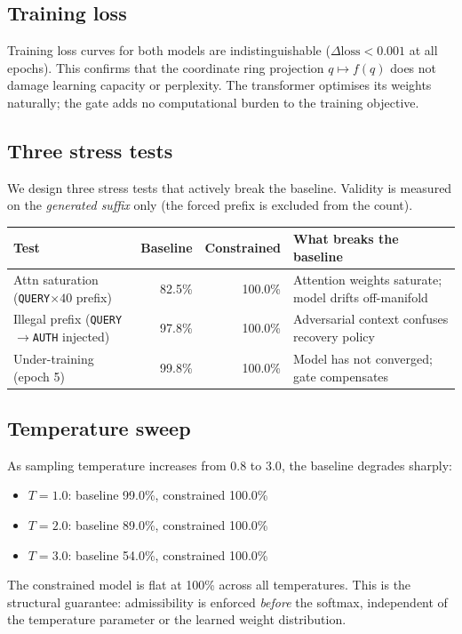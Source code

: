 \documentclass[11pt,a4paper]{article}
\begin{document}
\subsection{Training loss}

Training loss curves for both models are indistinguishable
($\Delta\mathrm{loss} < 0.001$ at all epochs).
This confirms that the coordinate ring projection
$q \mapsto f(q)$ does not damage learning capacity or
perplexity. The transformer optimises its weights naturally;
the gate adds no computational burden to the training objective.

\subsection{Three stress tests}

We design three stress tests that actively break the baseline.
Validity is measured on the \emph{generated suffix} only
(the forced prefix is excluded from the count).

\begin{center}
\renewcommand{\arraystretch}{1.35}
\begin{tabular}{lrrl}
\toprule
\textbf{Test} & \textbf{Baseline} & \textbf{Constrained} & \textbf{What breaks the baseline} \\
\midrule
Attn saturation (\texttt{QUERY}$\times 40$ prefix) &
  82.5\% & 100.0\% &
  Attention weights saturate; model drifts off-manifold \\
Illegal prefix (\texttt{QUERY}$\to$\texttt{AUTH} injected) &
  97.8\% & 100.0\% &
  Adversarial context confuses recovery policy \\
Under-training (epoch 5) &
  99.8\% & 100.0\% &
  Model has not converged; gate compensates \\
\bottomrule
\end{tabular}
\end{center}

\subsection{Temperature sweep}

As sampling temperature increases from $0.8$ to $3.0$,
the baseline degrades sharply:
\begin{itemize}
  \item $T=1.0$: baseline 99.0\%, constrained 100.0\%
  \item $T=2.0$: baseline 89.0\%, constrained 100.0\%
  \item $T=3.0$: baseline 54.0\%, constrained 100.0\%
\end{itemize}
The constrained model is flat at 100\% across all temperatures.
This is the structural guarantee: admissibility is enforced
\emph{before} the softmax, independent of the temperature
parameter or the learned weight distribution.
\end{document}
